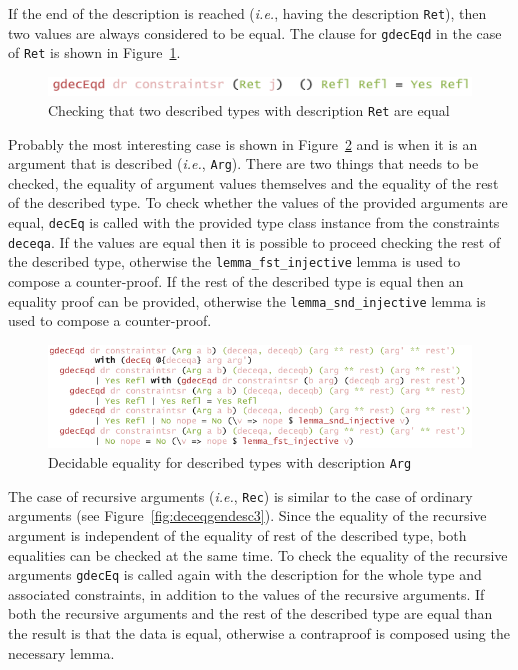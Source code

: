\documentclass{ituthesis}
\newcommand{\ttconstructor}[1]{\textcolor{constructor-color}{\texttt{#1}}}
\newcommand{\ttdec}[1]{\textcolor{declared-var-color}{\texttt{#1}}}
\newcommand{\ttvar}[1]{\textcolor{local-var-color}{\texttt{#1}}}
\theoremstyle{break}
\begin{document}
If the end of the description is reached (\textit{i.e.}, having the description \ttconstructor{Ret}), then two values are always considered to be equal.
The clause for \ttdec{gdecEqd} in the case of \ttconstructor{Ret} is shown in Figure~\ref{fig:deceqgendesc1}.

\begin{figure}[ht]
\begin{center}
    \includegraphics[scale=0.5]{Figures/GenericDecEqDesc1.png}
\end{center}
\caption{Checking that two described types with description \ttconstructor{Ret} are equal}
\label{fig:deceqgendesc1}
\end{figure}

Probably the most interesting case is shown in Figure~\ref{fig:deceqgendesc2} and is when it is an argument that is described (\textit{i.e.}, \ttconstructor{Arg}).
There are two things that needs to be checked, the equality of argument values themselves and the equality of the rest of the described type.
To check whether the values of the provided arguments are equal, \ttdec{decEq} is called with the provided type class instance from the constraints \ttvar{deceqa}.
If the values are equal then it is possible to proceed checking the rest of the described type, otherwise the \ttdec{lemma\_fst\_injective} lemma is used to compose a counter-proof.
If the rest of the described type is equal then an equality proof can be provided, otherwise the \ttdec{lemma\_snd\_injective} lemma is used to compose a counter-proof.

\begin{figure}[ht]
\begin{center}
    \includegraphics[scale=0.5]{Figures/GenericDecEqDesc2.png}
\end{center}
\caption{Decidable equality for described types with description \ttconstructor{Arg}}
\label{fig:deceqgendesc2}
\end{figure}

The case of recursive arguments (\textit{i.e.}, \ttconstructor{Rec}) is similar to the case of ordinary arguments (see Figure~\ref{fig:deceqgendesc3}).
Since the equality of the recursive argument is independent of the equality of rest of the described type, both equalities can be checked at the same time.
To check the equality of the recursive arguments \ttdec{gdecEq} is called again with the description for the whole type and associated constraints, in addition to the values
of the recursive arguments.
If both the recursive arguments and the rest of the described type are equal than the result is that the data is equal,
otherwise a contraproof is composed using the necessary lemma.
\end{document}
